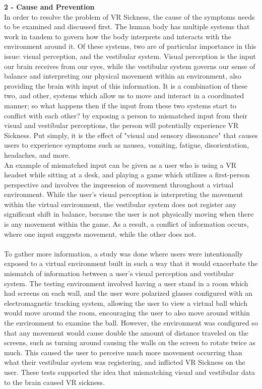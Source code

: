 \documentclass{article}
\begin{document}
\textbf{2 - Cause and Prevention} \\
In order to resolve the problem of VR Sickness, the cause of the symptoms needs to be examined and discussed first. The human body has multiple systems that work in tandem to govern how the body interprets and interacts with the environment around it. Of these systems, two are of particular importance in this issue: visual perception, and the vestibular system. Visual perception is the input our brain receives from our eyes, while the vestibular system governs our sense of balance and interpreting our physical movement within an environment, also providing the brain with input of this information. It is a combination of these two, and other, systems which allow us to move and interact in a coordinated manner; so what happens then if the input from these two systems start to conflict with each other? by exposing a person to mismatched input from their visual and vestibular perceptions, the person will potentially experience VR Sickness\cite{article4cite}. Put simply, it is the effect of "visual and sensory dissonance"\cite{article5cite} that causes users to experience symptoms such as nausea, vomiting, fatigue, disorientation, headaches, and more\cite{article3cite}. \\
An example of mismatched input can be given as a user who is using a VR headset while sitting at a desk, and playing a game which utilizes a first-person perspective and involves the impression of movement throughout a virtual environment. While the user's visual perception is interpreting the movement within the virtual environment, the vestibular system does not register any significant shift in balance, because the user is not physically moving when there is any movement within the game. As a result, a conflict of information occurs, where one input suggests movement, while the other does not. \\ \\
To gather more information, a study was done where users were intentionally exposed to a virtual environment built in such a way that it would exacerbate the mismatch of information between a user's visual perception and vestibular system\cite{article4cite}. The testing environment involved having a user stand in a room which had screens on each wall, and the user wore polarized glasses configured with an electromagnetic tracking system, allowing the user to view a virtual ball which would move around the room, encouraging the user to also move around within the environment to examine the ball. However, the environment was configured so that any movement would cause double the amount of distance traveled on the screens, such as turning around causing the walls on the screen to rotate twice as much. This caused the user to perceive much more movement occurring than what their vestibular system was registering, and inflicted VR Sickness on the user. These tests supported the idea that mismatching visual and vestibular data to the brain caused VR sickness\cite{article4cite}. \\ \\
\end{document}
